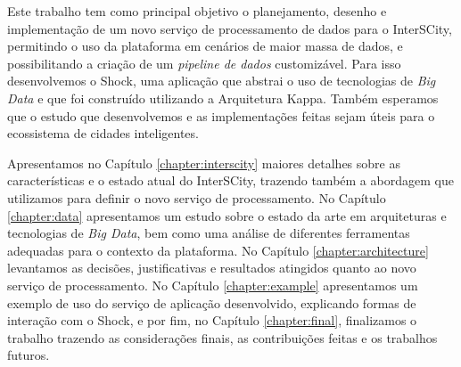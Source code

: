 Este trabalho tem como principal objetivo o planejamento, desenho e
implementação de um novo serviço de processamento de dados para o InterSCity,
permitindo o uso da plataforma em cenários de maior massa de dados, e
possibilitando a criação de um \textit{pipeline de dados} customizável. Para
isso desenvolvemos o Shock, uma aplicação que abstrai o uso de tecnologias
de \textit{Big Data} e que foi construído utilizando a Arquitetura Kappa.
Também esperamos que o estudo que desenvolvemos e as implementações feitas
sejam úteis para o ecossistema de cidades inteligentes.

Apresentamos no Capítulo \ref{chapter:interscity} maiores detalhes sobre as
características e o estado atual do InterSCity, trazendo também a abordagem que
utilizamos para definir o novo serviço de processamento. No Capítulo
\ref{chapter:data} apresentamos um estudo sobre o estado da arte em arquiteturas
e tecnologias de \textit{Big Data}, bem como uma análise de diferentes
ferramentas adequadas para o contexto da plataforma. No Capítulo
\ref{chapter:architecture} levantamos as decisões, justificativas e resultados
atingidos quanto ao novo serviço de processamento. No Capítulo
\ref{chapter:example} apresentamos um exemplo de uso do serviço de aplicação
desenvolvido, explicando formas de interação com o Shock, e por fim, no Capítulo
\ref{chapter:final}, finalizamos o trabalho trazendo as considerações
finais, as contribuições feitas e os trabalhos futuros.
